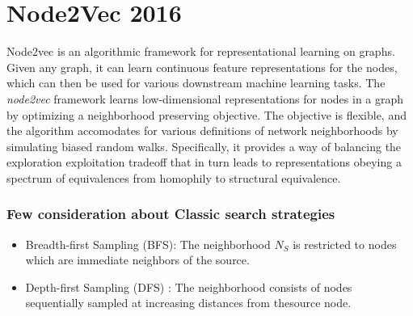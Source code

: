 \documentclass[12pt,a4paper]{article}
\begin{document}
\newpage

\section*{Node2Vec 2016}

Node2vec is an algorithmic framework for representational learning on graphs. Given any graph, it can learn continuous feature representations for the nodes, which can then be used for various downstream machine learning tasks. The \textit{node2vec} framework learns low-dimensional representations for nodes in a graph by optimizing a neighborhood preserving objective. The objective is flexible, and the algorithm accomodates for various definitions of network neighborhoods by simulating biased random walks. Specifically, it provides a way of balancing the exploration exploitation tradeoff that in turn leads to representations obeying a spectrum of equivalences from homophily to structural equivalence. 

\subsubsection*{Few consideration about Classic search strategies}

\begin{itemize}
\item Breadth-first Sampling (BFS): The neighborhood $N_{S}$ is restricted to nodes which are immediate neighbors of the source.
\item Depth-first Sampling (DFS) : The neighborhood consists of nodes sequentially sampled at increasing distances from thesource node.
\end{itemize}
\end{document}
